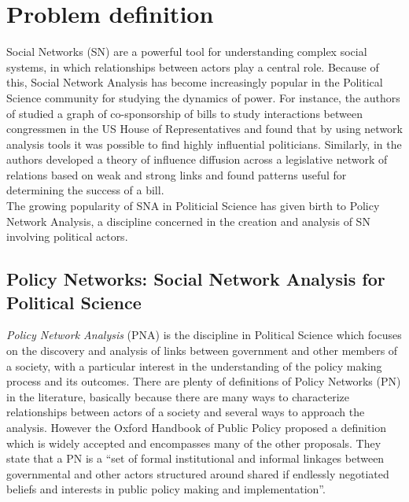 \section{Problem definition}\label{sec:problem_definition}

Social Networks (SN) are a powerful tool for understanding complex social systems, in which relationships between actors play a central role. Because of this, Social Network Analysis has become increasingly popular in the Political Science community for studying the dynamics of power. For instance, the authors of \cite{fowler2006connecting} studied a graph of co-sponsorship of bills to study interactions between congressmen in the US House of Representatives and found that by using network analysis tools it was possible to find highly influential politicians. Similarly, in \cite{kirkland2011relational} the authors  developed a theory of influence diffusion across a legislative network of relations based on weak and strong links and found patterns useful for determining the success of a bill.\\

The growing popularity of SNA in Politicial Science has given birth to Policy Network Analysis, a discipline concerned in the creation and analysis of SN involving political actors.\\


\subsection{Policy Networks: Social Network Analysis for Political Science}\label{subsec:defining_pn}

\emph{Policy Network Analysis} (PNA) is the discipline in Political Science which focuses on the discovery and analysis of links between government and other members of a society, with a particular interest in the understanding of the policy making process and its outcomes. There are plenty of definitions of Policy Networks (PN) in the literature, basically because there are many ways to characterize relationships between actors of a society and several ways to approach the analysis. However the Oxford Handbook of Public Policy proposed a definition which is widely accepted and encompasses many of the other proposals. They state that a PN is a ``set of formal institutional and informal linkages between governmental and other actors structured around shared if endlessly negotiated beliefs and interests in public policy making and implementation''\cite{moran2008oxford}. \\

